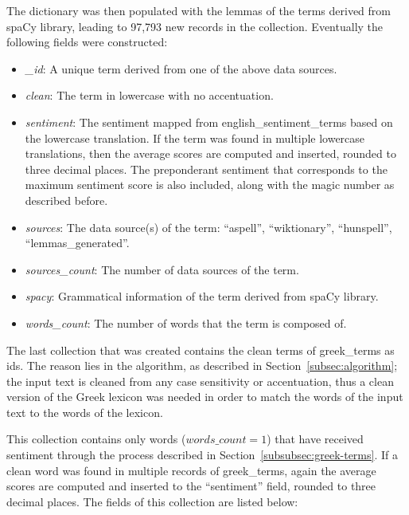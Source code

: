 The dictionary was then populated with the lemmas of the terms
derived from spaCy library, leading to 97,793 new records in the collection.
Eventually the following fields were constructed:

\begin{itemize}
 \item \emph{\_id}: A unique term derived from one of the above data sources.
 
 \item \emph{clean}: The term in lowercase with no accentuation.
 
 \item \emph{sentiment}: The sentiment mapped from english\_sentiment\_terms
 based on the lowercase translation.
 If the term was found in multiple lowercase translations,
 then the average scores are computed and inserted,
 rounded to three decimal places.
 The preponderant sentiment that corresponds to the maximum sentiment score
 is also included, along with the magic number as described before.
 
 \item \emph{sources}: The data source(s) of the term:
 ``aspell'', ``wiktionary'', ``hunspell'', ``lemmas\_generated''.
 
 \item \emph{sources\_count}: The number of data sources of the term.
 
 \item \emph{spacy}: Grammatical information of the term
 derived from spaCy library.
 
 \item \emph{words\_count}: The number of words that the term is composed of.
\end{itemize}

\label{subsubsubsection:greek-sentiment-terms}

The last collection that was created
contains the clean terms of greek\_terms as ids.
The reason lies in the algorithm,
as described in Section~\ref{subsec:algorithm};
the input text is cleaned from any case sensitivity or accentuation,
thus a clean version of the Greek lexicon was needed
in order to match the words of the input text to the words of the lexicon.

This collection contains only words ($words\_count = 1$)
that have received sentiment through the process
described in Section~\ref{subsubsec:greek-terms}.
If a clean word was found in multiple records of greek\_terms,
again the average scores are computed and inserted
to the ``sentiment'' field,
rounded to three decimal places.
The fields of this collection are listed below:

